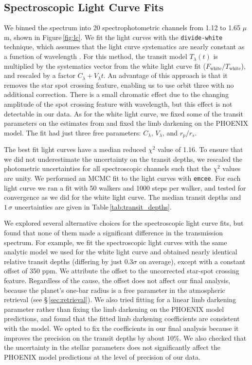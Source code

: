 \documentclass[twocolumn]{aastex61}
\begin{document}
\subsection{Spectroscopic Light Curve Fits}
We binned the spectrum into 20 spectrophotometric channels from 1.12 to 1.65 $\mu$m, shown in Figure\,\ref{fig:lc}. We fit the light curves with the \texttt{divide-white} technique, which assumes that the light curve systematics are nearly constant as a function of wavelength \citep{stevenson14c, kreidberg14a}. For this method, the transit model $T_\lambda(t)$ is multiplied by the systematics vector from the white light curve fit ($F_\mathrm{white}/T_\mathrm{white}$), and rescaled by a factor $C_\lambda + V_\lambda t$.  An advantage of this approach is that it removes the star spot crossing feature, enabling us to use orbit three with no additional correction. There is a small chromatic effect due to the changing amplitude of the spot crossing feature with wavelength, but this effect is not detectable in our data.  As for the white light curve, we fixed some of the transit parameters on the estimates from \cite{dai17} and fixed the limb darkening on the PHOENIX model. The fit had just three free parameters: $C_\lambda$, $V_\lambda$, and $r_p/r_s$.  

The best fit light curves have a median reduced $\chi^2$ value of 1.16.  To ensure that we did not underestimate the uncertainty on the transit depths, we rescaled the photometric uncertainties for all spectroscopic channels such that the $\chi^2$ values are unity. We performed an MCMC fit to the light curves with \texttt{emcee}.  For each light curve we ran a fit with 50 walkers and 1000 steps per walker, and tested for convergence as we did for the white light curve. The median transit depths and $1\,\sigma$ uncertainties are given in Table\,\ref{tab:transit_depths}. 

We explored several alternative choices for the spectroscopic light curve fits, but found that none of them made a significant difference in the transmission spectrum. For example, we fit the spectroscopic light curves with the same analytic model we used for the white light curve and obtained nearly identical relative transit depths (differing by just $0.3\sigma$ on average), except with a constant offset of 350 ppm. We attribute the offset to the uncorrected star-spot crossing feature. Regardless of the cause, the offset does not affect our final analysis, because the planet's one-bar radius is a free parameter in the atmospheric retrieval (see \S\,\ref{sec:retrieval}). We also tried fitting for a linear limb darkening parameter rather than fixing the limb darkening on the PHOENIX model predictions, and found that the fitted limb darkening coefficients are consistent with the model.  We opted to fix the coefficients in our final analysis because it improves the precision on the transit depths by about 10\%. We also checked that the uncertainty in the stellar parameters does not significantly affect the PHOENIX model predictions at the level of precision of our data. 
\end{document}
